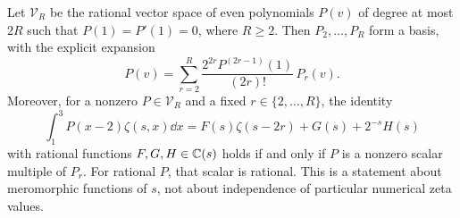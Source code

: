 \begin{theorem}
\label{ag:thm:selector-classification}
Let $\mathscr V_R$ be the rational vector space of even polynomials
$P(v)$ of degree at most $2R$ such that $P(1)=P'(1)=0$, where $R\ge2$.
Then $P_2,\ldots,P_R$ form a basis, with the explicit expansion
\begin{equation}\label{ag:eq:selector-expansion}
 \boxed{
 P(v)=\sum_{r=2}^R\frac{2^{2r}P^{(2r-1)}(1)}{(2r)!}\,P_r(v).}
\end{equation}
Moreover, for a nonzero $P\in\mathscr V_R$ and a fixed $r\in\{2,\ldots,R\}$,
the identity
\begin{equation}\label{ag:eq:selector-class}
 \int_1^3P(x-2)\zeta(s,x)\dd x
 =F(s)\zeta(s-2r)+G(s)+2^{-s}H(s)
\end{equation}
with rational functions $F,G,H\in\mathbb C(s)$ holds if and only if $P$ is a
nonzero scalar multiple of $P_r$. For rational $P$, that scalar is
rational. This is a statement about meromorphic functions of $s$, not
about independence of particular numerical zeta values.
\end{theorem}
